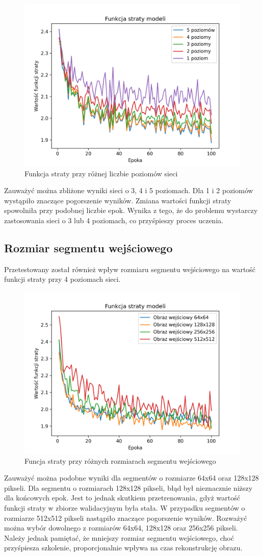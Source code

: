 \documentclass[a4paper, 12pt]{article}
\begin{document}
\thispagestyle{empty}
\newpage
\restoregeometry
\begin{figure}[h!]
\begin{center}
	\includegraphics[width=0.7\columnwidth]{layers.png}
	\caption{Funkcja straty przy różnej liczbie poziomów sieci}
\end{center}
\end{figure}
Zauważyć można zbliżone wyniki sieci o 3, 4 i 5 poziomach.
Dla 1 i 2 poziomów wystąpiło znaczące pogorszenie wyników. Zmiana wartości funkcji straty spowolniła przy podobnej liczbie epok.
Wynika z tego, że do problemu wystarczy zastosowania sieci o 3 lub 4 poziomach, co przyśpieszy proces uczenia.
\subsection{Rozmiar segmentu wejściowego}
Przetestowany został również wpływ rozmiaru segmentu wejściowego na wartość funkcji straty przy 4 poziomach sieci.
\begin{figure}[h!]
\begin{center}
	\includegraphics[width=0.7\columnwidth]{size.png}
	\caption{Funcja straty przy różnych rozmiarach segmentu wejściowego}
	\label{fig:size}
\end{center}
\end{figure}
Zauważyć można podobne wyniki dla segmentów o rozmiarze 64x64 oraz 128x128 pikseli.
Dla segmentu o rozmiarach 128x128 pikseli, błąd był nieznacznie niższy dla końcowych epok.
Jest to jednak skutkiem przetrenowania, gdyż wartość funkcji straty w zbiorze walidacyjnym była stała.
W przypadku segmentów o rozmiarze 512x512 pikseli nastąpiło znaczące pogorszenie wyników.
Rozważyć można wybór dowolnego z rozmiarów 64x64, 128x128 oraz 256x256 pikseli.
Należy jednak pamiętać, że mniejszy rozmiar segmentu wejściowego, choć przyśpiesza szkolenie,
proporcjonalnie wpływa na czas rekonstrukcję obrazu.
\end{document}

